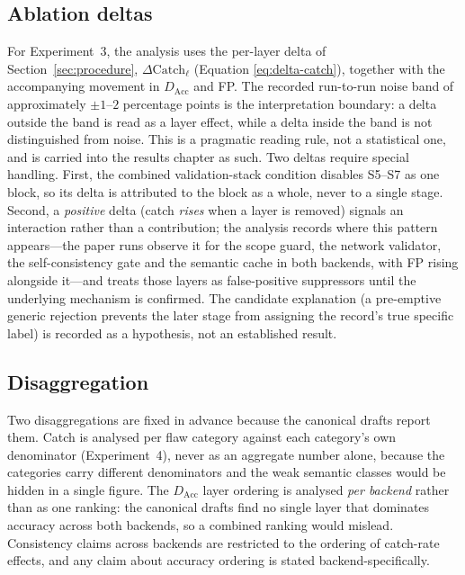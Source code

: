 \subsection*{Ablation deltas}

For Experiment~3, the analysis uses the per-layer delta of
Section~\ref{sec:procedure}, $\Delta\mathrm{Catch}_{\ell}$ (Equation
\ref{eq:delta-catch}), together with the accompanying movement in
$D_{\mathrm{Acc}}$ and FP. The recorded run-to-run noise band of approximately
$\pm1$--$2$ percentage points is the interpretation boundary: a delta outside the
band is read as a layer effect, while a delta inside the band is not
distinguished from noise. This is a pragmatic reading rule, not a statistical
one, and is carried into the results chapter as such. Two deltas require special
handling. First, the combined validation-stack condition disables S5--S7 as one
block, so its delta is attributed to the block as a whole, never to a single
stage. Second, a \emph{positive} delta (catch \emph{rises} when a layer is
removed) signals an interaction rather than a contribution; the analysis records
where this pattern appears---the paper runs observe it for the scope guard, the
network validator, the self-consistency gate and the semantic cache in both
backends, with FP rising alongside it---and treats those layers as
false-positive suppressors until the underlying mechanism is confirmed. The
candidate explanation (a pre-emptive generic rejection prevents the later stage
from assigning the record's true specific label) is recorded as a hypothesis,
not an established result.

\subsection*{Disaggregation}

Two disaggregations are fixed in advance because the canonical drafts report
them. Catch is analysed per flaw category against each category's own
denominator (Experiment~4), never as an aggregate number alone, because the
categories carry different denominators and the weak semantic classes would be
hidden in a single figure. The $D_{\mathrm{Acc}}$ layer ordering is analysed
\emph{per backend} rather than as one ranking: the canonical drafts find no
single layer that dominates accuracy across both backends, so a combined ranking
would mislead. Consistency claims across backends are restricted to the ordering
of catch-rate effects, and any claim about accuracy ordering is stated
backend-specifically.

